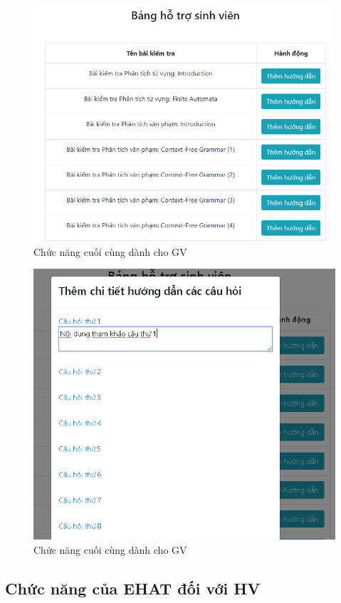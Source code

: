 \begin{itemize}
	\begin{center}
		\begin{figure}[htp]
			\begin{center}
				\includegraphics[width=0.6\linewidth]{img/30}
			\end{center}
			\caption{Chức năng cuối cùng dành cho GV}
			\label{refhinh75}
		\end{figure}
	\end{center}

	\begin{center}
		\begin{figure}[htp]
			\begin{center}
				\includegraphics[width=0.6\linewidth]{img/31}
			\end{center}
			\caption{Chức năng cuối cùng dành cho GV}
			\label{refhinh76}
		\end{figure}
	\end{center}

\end{itemize}

\vskip 6cm
\subsection{Chức năng của EHAT đối với HV}

